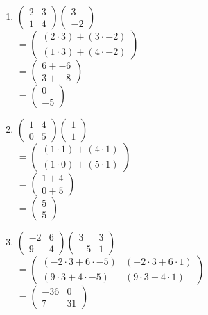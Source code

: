 \documentclass[a4paper]{article}
\begin{document}
\begin{enumerate}[1.]
		\item $\begin{pmatrix}2 & 3 \\ 1 & 4\end{pmatrix}\begin{pmatrix}3 \\ -2\end{pmatrix}$\\
		$=\begin{pmatrix}(2 \cdot 3) + (3 \cdot -2) \\ (1 \cdot 3)+(4 \cdot -2)\end{pmatrix}$\\
		$=\begin{pmatrix}6 + -6 \\ 3 + -8\end{pmatrix}$\\
		$=\begin{pmatrix}0 \\ -5\end{pmatrix}$

		\item $\begin{pmatrix}1 & 4 \\ 0 & 5\end{pmatrix}\begin{pmatrix}1 \\ 1\end{pmatrix}$\\
		$=\begin{pmatrix}(1 \cdot 1)+(4 \cdot 1) \\ (1 \cdot 0) + (5 \cdot 1)\end{pmatrix}$\\
		$=\begin{pmatrix}1+4\\0+5\end{pmatrix}$\\
		$=\begin{pmatrix}5 \\ 5\end{pmatrix}$

		\item $\begin{pmatrix}-2 & 6 \\ 9 & 4\end{pmatrix}\begin{pmatrix}3 & 3 \\ -5 & 1\end{pmatrix}$\\
		$=\begin{pmatrix}(-2 \cdot 3 + 6 \cdot -5) & (-2 \cdot 3 + 6 \cdot 1) \\ (9 \cdot 3 + 4 \cdot -5) & (9 \cdot 3 + 4 \cdot 1)\end{pmatrix}$\\
		$=\begin{pmatrix}-36 & 0 \\ 7 & 31\end{pmatrix}$
	\end{enumerate}
\end{document}
